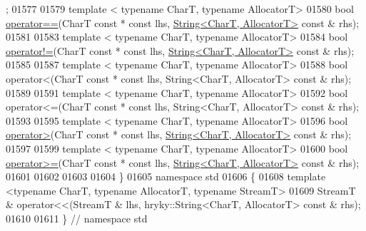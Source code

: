 \begin{DoxyCode}
      ;
01577 
01579     \textcolor{keyword}{template} < \textcolor{keyword}{typename} CharT, \textcolor{keyword}{typename} AllocatorT>
01580     \textcolor{keywordtype}{bool} \hyperlink{namespacehryky_a96bfe0df0a09db56e7253330de4f2243}{operator==}(CharT \textcolor{keyword}{const} * \textcolor{keyword}{const} lhs, \hyperlink{classhryky_1_1_string}{String<CharT, AllocatorT>} \textcolor{keyword}{const} & 
      rhs);
01581 
01583     \textcolor{keyword}{template} < \textcolor{keyword}{typename} CharT, \textcolor{keyword}{typename} AllocatorT>
01584     \textcolor{keywordtype}{bool} \hyperlink{namespacehryky_af83d27d9a54004f5981499e910bb7cb8}{operator!=}(CharT \textcolor{keyword}{const} * \textcolor{keyword}{const} lhs, \hyperlink{classhryky_1_1_string}{String<CharT, AllocatorT>} \textcolor{keyword}{const} & 
      rhs);
01585 
01587     \textcolor{keyword}{template} < \textcolor{keyword}{typename} CharT, \textcolor{keyword}{typename} AllocatorT>
01588     \textcolor{keywordtype}{bool} operator<(CharT const * const lhs, String<CharT, AllocatorT> \textcolor{keyword}{const} & 
      rhs);
01589 
01591     \textcolor{keyword}{template} < \textcolor{keyword}{typename} CharT, \textcolor{keyword}{typename} AllocatorT>
01592     \textcolor{keywordtype}{bool} operator<=(CharT const * const lhs, String<CharT, AllocatorT> \textcolor{keyword}{const} & 
      rhs);
01593 
01595     \textcolor{keyword}{template} < \textcolor{keyword}{typename} CharT, \textcolor{keyword}{typename} AllocatorT>
01596     \textcolor{keywordtype}{bool} \hyperlink{namespacehryky_af7f213d8e2d7f4c75ac2c93d7be56365}{operator>}(CharT \textcolor{keyword}{const} * \textcolor{keyword}{const} lhs, \hyperlink{classhryky_1_1_string}{String<CharT, AllocatorT>} \textcolor{keyword}{const} & 
      rhs);
01597 
01599     \textcolor{keyword}{template} < \textcolor{keyword}{typename} CharT, \textcolor{keyword}{typename} AllocatorT>
01600     \textcolor{keywordtype}{bool} \hyperlink{namespacehryky_acc487ba69503ce030df6f4b9db4cbe8b}{operator>=}(CharT \textcolor{keyword}{const} * \textcolor{keyword}{const} lhs, \hyperlink{classhryky_1_1_string}{String<CharT, AllocatorT>} \textcolor{keyword}{const} & 
      rhs);
01601 
01602     
01603 
01604 \}
01605 \textcolor{keyword}{namespace }std
01606 \{
01608     \textcolor{keyword}{template} <\textcolor{keyword}{typename} CharT, \textcolor{keyword}{typename} AllocatorT, \textcolor{keyword}{typename} StreamT>
01609     StreamT & operator<<(StreamT & lhs, hryky::String<CharT, AllocatorT> \textcolor{keyword}{const} 
      & rhs);
01610 
01611 \} \textcolor{comment}{// namespace std}

\end{DoxyCode}
